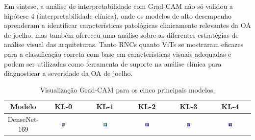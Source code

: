 Em síntese, a análise de interpretabilidade com Grad-CAM não só validou a hipótese 4 (interpretabilidade clínica), onde os modelos de alto desempenho aprenderam a identificar características patológicas clinicamente relevantes da OA de joelho, mas também ofereceu uma análise sobre as diferentes estratégias de análise visual das arquiteturas. Tanto RNCs quanto ViTs se mostraram eficazes para a classificação correta com base em características visuais adequadas e podem ser utilizadas como ferramenta de suporte na análise clínica para diagnosticar a severidade da OA de joelho.

\begin{table}
    \centering
    \caption{Visualização Grad-CAM para os cinco principais modelos.}
    \label{tab:gradcams_top5_models}
    \begin{tabular}{|c|c|c|c|c|c|}
        \hline
        \textbf{Modelo} & \textbf{KL-0} & \textbf{KL-1} & \textbf{KL-2} & \textbf{KL-3} & \textbf{KL-4} \\ \hline
        DenseNet-169 & \includegraphics[width=0.15\textwidth]{figs/gradcams/gradcam_densenet169_kl0.png} & \includegraphics[width=0.15\textwidth]{figs/gradcams/gradcam_densenet169_kl1.png} & \includegraphics[width=0.15\textwidth]{figs/gradcams/gradcam_densenet169_kl2.png} & \includegraphics[width=0.15\textwidth]{figs/gradcams/gradcam_densenet169_kl3.png} & \includegraphics[width=0.15\textwidth]{figs/gradcams/gradcam_densenet169_kl4.png} \\ \hline

\end{tabular}
\end{table}
